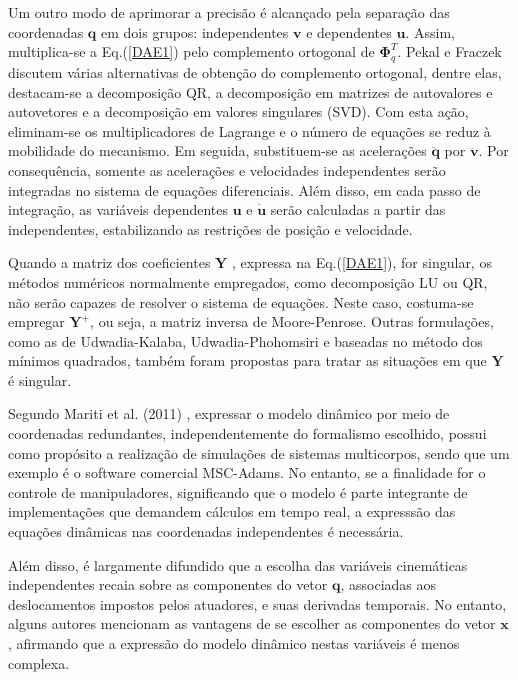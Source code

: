 \documentclass[]{politex}
\begin{document}

Um outro modo de aprimorar a precisão é alcançado pela separação das coordenadas $\mathbf{q}$ em dois grupos: independentes $\mathbf{v}$ e dependentes $\mathbf{u}$. Assim, multiplica-se a Eq.(\ref{DAE1}) pelo complemento ortogonal \cite{iran} de $\boldsymbol{\Phi}_q^T$. Pekal e Fraczek \cite{pekalb} discutem várias alternativas de obtenção do complemento ortogonal, dentre elas, destacam-se a decomposição QR, a decomposição em matrizes de autovalores e autovetores e a decomposição em valores singulares (SVD). Com esta ação, eliminam-se os multiplicadores de Lagrange e o número de equações se reduz à mobilidade do mecanismo. Em seguida, substituem-se as acelerações $\ddot{\mathbf{q}}$ por $\ddot{\mathbf{v}}$. Por consequência, somente as acelerações e velocidades independentes serão integradas no sistema de equações diferenciais. Além disso, em cada passo de integração, as variáveis dependentes $\mathbf{u}$ e $\dot{\mathbf{u}}$ serão calculadas a partir das independentes, estabilizando as restrições de posição e velocidade.

Quando a matriz dos coeficientes $\mathbf{Y}$ , expressa na Eq.(\ref{DAE1}), for singular, os métodos numéricos normalmente empregados, como decomposição LU ou QR, não serão capazes de resolver o sistema de equações. Neste caso, costuma-se empregar $\mathbf{Y}^+$, ou seja, a matriz inversa de Moore-Penrose. Outras formulações, como as de Udwadia-Kalaba, Udwadia-Phohomsiri e baseadas no método dos mínimos quadrados, também foram propostas para tratar as situações em que $\mathbf{Y}$ é singular.

Segundo Mariti et al. (2011) \cite{mariti}, expressar o modelo dinâmico por meio de coordenadas redundantes, independentemente do formalismo escolhido, possui como propósito a realização de simulações de sistemas multicorpos, sendo que um exemplo é o software comercial MSC-Adams. No entanto, se a finalidade for o controle de manipuladores, significando que o modelo é parte integrante de implementações que demandem  cálculos em tempo real, a expresssão das equações dinâmicas nas coordenadas independentes é necessária.

Além disso, é largamente difundido que a escolha das variáveis cinemáticas independentes recaia sobre as componentes do vetor $\mathbf{q}$, associadas aos deslocamentos impostos pelos atuadores, e suas derivadas temporais. No entanto, alguns autores \cite{Li, khalil} mencionam as vantagens de se escolher as componentes do vetor $\mathbf{x}$, afirmando que a expressão do modelo dinâmico nestas variáveis é menos complexa.
\end{document}
